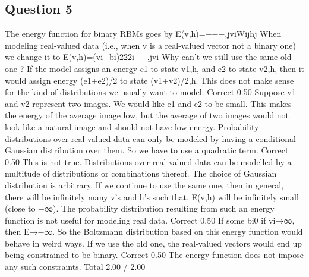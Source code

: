 \subsection*{Question 5}
The energy function for binary RBMs goes by 
E(v,h)=−\sumivibi−\sumjhjaj−\sumi,jviWijhj 
When modeling real-valued data (i.e., when v is a real-valued vector not a binary one) we change it to 
E(v,h)=\sumi(vi−bi)22\sigma2i−\sumjhjaj−\sumi,jvi\sigmaiWijhj 
Why can't we still use the same old one ?
If the model assigns an energy e1 to state v1,h, and e2 to state v2,h, then it would assign energy (e1+e2)/2 to state (v1+v2)/2,h. This does not make sense for the kind of distributions we usually want to model.	Correct	0.50	Suppose v1 and v2 represent two images. We would like e1 and e2 to be small. This makes the energy of the average image low, but the average of two images would not look like a natural image and should not have low energy.
Probability distributions over real-valued data can only be modeled by having a conditional Gaussian distribution over them. So we have to use a quadratic term.	Correct	0.50	This is not true. Distributions over real-valued data can be modelled by a multitude of distributions or combinations thereof. The choice of Gaussian distribution is arbitrary.
If we continue to use the same one, then in general, there will be infinitely many v's and h's such that, E(v,h) will be infinitely small (close to −∞). The probability distribution resulting from such an energy function is not useful for modeling real data.	Correct	0.50	If some bi0 if vi→∞, then E→−∞. So the Boltzmann distribution based on this energy function would behave in weird ways.
If we use the old one, the real-valued vectors would end up being constrained to be binary.	Correct	0.50	The energy function does not impose any such constraints.
Total		2.00 / 2.00	
